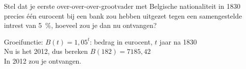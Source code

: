 \begin{oef}
Stel dat je eerste over-over-over-grootvader met Belgische nationaliteit in 1830 precies \'e\'en eurocent bij een
bank zou hebben uitgezet tegen een samengestelde intrest van \SI{5}{\percent}, hoeveel zou je dan nu ontvangen?
\begin{opl}
Groeifunctie: $B(t)=1,05^t$: bedrag in eurocent, $t$ jaar na 1830\\
Nu is het 2012, dus bereken $B(182)=7185,42$\\
In 2012 zou je  ontvangen.
\end{opl}
   
        
\end{oef}






